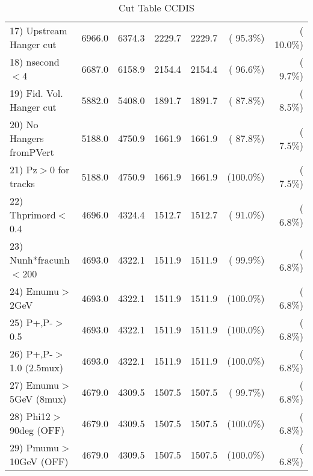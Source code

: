 \begin{table}[h!]
\begin{tabular}{||l||r|r|r|r|r|r||}
 17) Upstream Hanger cut  &       6966.0 &       6374.3 &       2229.7 &       2229.7 & ( 95.3\%) & ( 10.0\%) \\
 18) nsecond$<$4          &       6687.0 &       6158.9 &       2154.4 &       2154.4 & ( 96.6\%) & (  9.7\%) \\
 19) Fid. Vol. Hanger cut &       5882.0 &       5408.0 &       1891.7 &       1891.7 & ( 87.8\%) & (  8.5\%) \\
 20) No Hangers fromPVert &       5188.0 &       4750.9 &       1661.9 &       1661.9 & ( 87.8\%) & (  7.5\%) \\
 21) Pz$>$0 for tracks    &       5188.0 &       4750.9 &       1661.9 &       1661.9 & (100.0\%) & (  7.5\%) \\
 22) Thprimord$<$0.4      &       4696.0 &       4324.4 &       1512.7 &       1512.7 & ( 91.0\%) & (  6.8\%) \\
 23) Nunh*fracunh$<$200   &       4693.0 &       4322.1 &       1511.9 &       1511.9 & ( 99.9\%) & (  6.8\%) \\
 24) Emumu$>$2GeV         &       4693.0 &       4322.1 &       1511.9 &       1511.9 & (100.0\%) & (  6.8\%) \\
 25) P+,P-$>$0.5          &       4693.0 &       4322.1 &       1511.9 &       1511.9 & (100.0\%) & (  6.8\%) \\
 26) P+,P-$>$1.0 (2.5mux) &       4693.0 &       4322.1 &       1511.9 &       1511.9 & (100.0\%) & (  6.8\%) \\
 27) Emumu$>$5GeV  (8mux) &       4679.0 &       4309.5 &       1507.5 &       1507.5 & ( 99.7\%) & (  6.8\%) \\
 28) Phi12$>$90deg  (OFF) &       4679.0 &       4309.5 &       1507.5 &       1507.5 & (100.0\%) & (  6.8\%) \\
 29) Pmumu$>$10GeV  (OFF) &       4679.0 &       4309.5 &       1507.5 &       1507.5 & (100.0\%) & (  6.8\%) \\
 \hline
 \hline
 \end{tabular}
 \caption{Cut Table  CCDIS    }
 \label{tab-cutcohjpsi-mumu_ccdis}
 \end{table}
